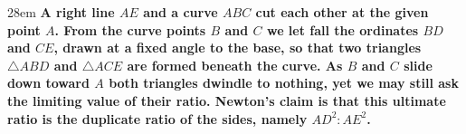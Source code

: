 \documentclass[border=4pt]{standalone}
\begin{document}
\begin{varwidth}{28em}
\large\bfseries
A right line \textcolor{lineblue}{$AE$} and a \textcolor{curvegreen}{curve $ABC$} cut each other at the      given point $A$. From the curve points $B$ and $C$ we let fall the \textcolor{ordorange}{ordinates      $BD$ and $CE$}, drawn at a fixed angle to the base, so that two triangles $\triangle ABD$      and $\triangle ACE$ are formed beneath the curve. As $B$ and $C$ slide down toward $A$      both triangles dwindle to nothing, yet we may still ask the limiting value of their ratio.      Newton's claim is that this ultimate ratio is the \textcolor{ordorange}{duplicate ratio of the sides},      namely $AD^2 : AE^2$.
\end{varwidth}
\end{document}
